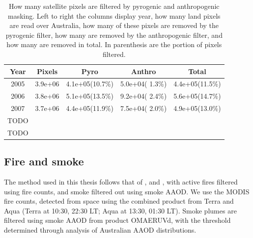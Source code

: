   \begin{table}
    \caption{How many satellite pixels are filtered by pyrogenic and anthropogenic masking. Left to right the columns display year, how many land pixels are read over Australia, how many of these pixels are removed by the pyrogenic filter, how many are removed by the anthropogenic filter, and how many are removed in total. In parenthesis are the portion of pixels filtered.}
    \begin{tabular}{ c c c c c }
      \textbf{Year} & \textbf{Pixels} & \textbf{Pyro} & \textbf{Anthro} & \textbf{Total} 
      \\ \hline
      2005   &  3.9e+06    &  4.1e+05(10.7\%)     &    5.0e+04( 1.3\%)    &    4.4e+05(11.5\%) \\
      2006   &  3.8e+06    &  5.1e+05(13.5\%)     &    9.2e+04( 2.4\%)    &    5.6e+05(14.7\%) \\
      2007   &  3.7e+06    &  4.4e+05(11.9\%)     &    7.5e+04( 2.0\%)    &    4.9e+05(13.0\%) \\
      TODO &  &  &  \\
      TODO &  &  &  \\
    \end{tabular}
    \label{Model:Filter:tab_summary_pixels_masked}
  \end{table}
  
  
  
  \subsection{Fire and smoke}
    \label{Model:Filter:fire}
    
    
    The method used in this thesis follows that of \textcite{Marais2012}, and \textcite{Barkley2013}, with active fires filtered using fire counts, and smoke filtered out using smoke AAOD.
    We use the MODIS fire counts, detected from space using the combined product from Terra and Aqua (Terra at 10:30, 22:30 LT; Aqua at 13:30, 01:30 LT).
    Smoke plumes are filtered using smoke AAOD from product OMAERUVd, with the threshold determined through analysis of Australian AAOD distributions.
    
